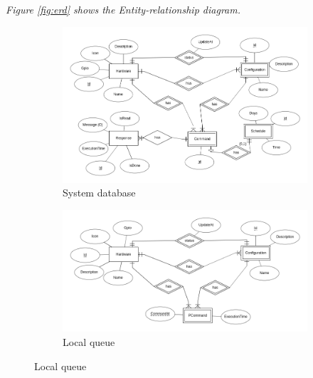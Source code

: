 \documentclass[12pt, oneside, a4paper]{book}
\begin{document}
			\textit{Figure \ref{fig:erd} shows the Entity-relationship diagram.} 
					\begin{figure}[H]
						\caption{Entity-relationship diagrams}
						\label{fig:erd}
						\begin{subfigure}[b]{\linewidth}
							\includegraphics[width=\linewidth]{img/diagram_er1.png}
							\caption{System database}
						\end{subfigure}

						\begin{subfigure}[b]{\linewidth}
							\includegraphics[width=\linewidth]{img/diagram_er2.png}
							\caption{Local queue}
						\end{subfigure}
					\end{figure}
				
\end{document}
